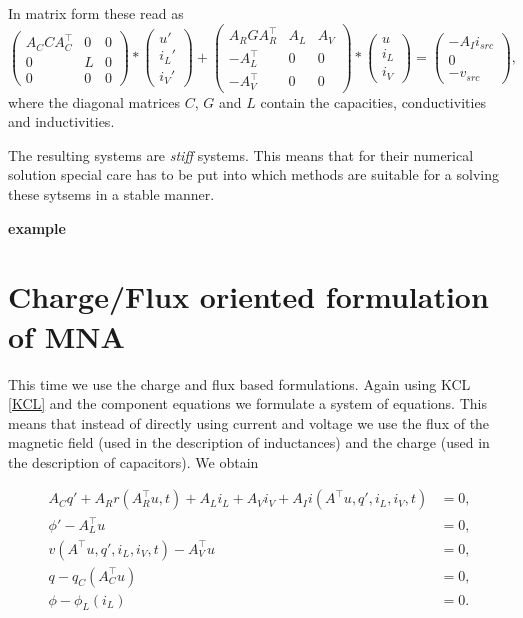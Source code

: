 In matrix form these read as
\begin{equation}
	\label{MNA_Matrixform}
	\begin{pmatrix}
		A_C C A_C^\top & 0 & 0 \\
		0 & L & 0 \\
		0 & 0 & 0
	\end{pmatrix}
	*
	\begin{pmatrix}
		u' \\
		i_L' \\
		i_V'
	\end{pmatrix}
	+
	\begin{pmatrix}
		A_R G A_R^\top & A_L & A_V \\
		-A_L^\top & 0 & 0 \\
		-A_V^\top & 0 & 0 
	\end{pmatrix}
	*
	\begin{pmatrix}
		u \\
		i_L \\
		i_V
	\end{pmatrix}
	=
	\begin{pmatrix}
		-A_I i_{src} \\
		0 \\
		-v_{src}
	\end{pmatrix} , 
\end{equation}
where the diagonal matrices $C$, $G$ and $L$ contain the capacities, conductivities and inductivities.

The resulting systems are \emph{stiff} systems. This means that for their numerical solution special care has to be put into which methods are suitable for a solving these sytsems in a stable manner.

\textbf{example}

\section{Charge/Flux oriented formulation of MNA}
\label{sec:charge flux oriented formulation}
 This time we use the charge and flux based formulations. Again using KCL \eqref{KCL} and the component equations we formulate a system of equations. This means that instead of directly using current and voltage we use the flux of the magnetic field (used in the description of inductances) and the charge (used in the description of capacitors). We obtain

\begin{align}
	A_C q' + A_R r(A_R^\top u,t) + A_L i_L + A_V i_V + A_I i(A^\top u, q', i_L, i_V, t) &= 0, \label{charge/flux-1} \\
	\phi' - A_L^\top u &= 0, \label{charge/flux-2} \\
	v(A^\top u, q', i_L, i_V, t) - A_V^\top u &= 0, \label{charge/flux-3} \\
	q - q_C(A_C^\top u) &= 0, \label{charge/flux-4} \\
	\phi - \phi_L(i_L) &= 0.  \label{charge/flux-5} 
\end{align}


